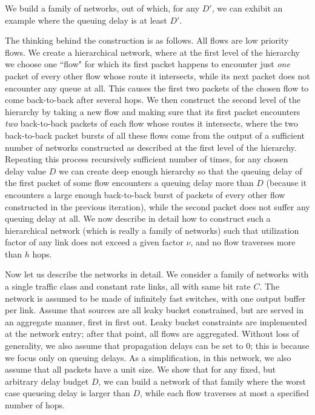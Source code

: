 \pr
We build a family of networks, out of which, for any $D'$, we can
exhibit an example where the queuing delay is at least $D'$.

The thinking behind the construction is as follows. All flows are
low priority flows. We create a
  hierarchical network, where at the first level of the
  hierarchy we choose one ``flow" for which its first
  packet happens to encounter just \emph{one} packet of every
  other flow whose route it intersects, while its next packet
  does not encounter any queue at all.  This causes the first
  two packets of the chosen flow to come back-to-back after
  several hops.  We then construct the second level of the
  hierarchy by taking a new flow and making sure that its
  first packet encounters \emph{two} back-to-back packets of each
  flow whose routes it intersects, where the two back-to-back
  packet bursts of all these flows come from the output of a
  sufficient number of networks constructed as described at
  the first level of the hierarchy. Repeating this process
  recursively sufficient number of times,  for any chosen
  delay value $D$ we can create deep enough hierarchy so that
  the queuing delay of the first packet of some flow
  encounters a queuing delay more than $D$ (because it
  encounters a large enough back-to-back burst of packets
  of every other flow constructed in the previous iteration),
  while the second packet does not suffer any queuing delay
  at all.   We now describe in detail how to construct such a
  hierarchical network (which is really a family of networks)
  such that utilization factor of any link does not exceed a
  given factor $\nu$, and no flow traverses more than $h$ hops.

Now let us describe the networks in detail. We consider a family
of networks with a single traffic class and constant rate links,
all with same bit rate $C$. The network is assumed to be made of
infinitely fast switches, with one output buffer per link. Assume
that sources are all leaky bucket constrained, but are served in
an aggregate manner, first in first out. Leaky bucket constraints
are implemented at the network entry; after that point, all flows
are aggregated. Without loss of generality, we also assume that
propagation delays can be set to 0; this is because we focus only
on queuing delays. As a simplification, in this network, we also
assume that all packets have a unit size. We show that for any
fixed, but arbitrary delay budget $D$, we can build a network of
that family where the worst case queueing delay is larger than
$D$, while each flow traverses at most a specified number of hops.

